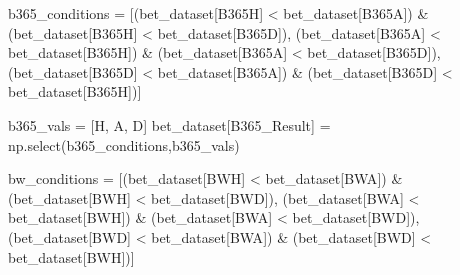 \documentclass[
  letterpaper,
  DIV=11,
  numbers=noendperiod]{scrartcl}
\newenvironment{Shaded}{\begin{snugshade}}{\end{snugshade}}
\newcommand{\NormalTok}[1]{\textcolor[rgb]{0.00,0.23,0.31}{#1}}
\newcommand{\OperatorTok}[1]{\textcolor[rgb]{0.37,0.37,0.37}{#1}}
\newcommand{\StringTok}[1]{\textcolor[rgb]{0.13,0.47,0.30}{#1}}
\begin{document}
\begin{Shaded}
\begin{Highlighting}[]
\NormalTok{b365\_conditions }\OperatorTok{=}\NormalTok{ [(bet\_dataset[}\StringTok{\textquotesingle{}B365H\textquotesingle{}}\NormalTok{] }\OperatorTok{\textless{}}\NormalTok{ bet\_dataset[}\StringTok{\textquotesingle{}B365A\textquotesingle{}}\NormalTok{]) }\OperatorTok{\&}\NormalTok{ (bet\_dataset[}\StringTok{\textquotesingle{}B365H\textquotesingle{}}\NormalTok{] }\OperatorTok{\textless{}}\NormalTok{ bet\_dataset[}\StringTok{\textquotesingle{}B365D\textquotesingle{}}\NormalTok{]),}
\NormalTok{                   (bet\_dataset[}\StringTok{\textquotesingle{}B365A\textquotesingle{}}\NormalTok{] }\OperatorTok{\textless{}}\NormalTok{ bet\_dataset[}\StringTok{\textquotesingle{}B365H\textquotesingle{}}\NormalTok{]) }\OperatorTok{\&}\NormalTok{ (bet\_dataset[}\StringTok{\textquotesingle{}B365A\textquotesingle{}}\NormalTok{] }\OperatorTok{\textless{}}\NormalTok{ bet\_dataset[}\StringTok{\textquotesingle{}B365D\textquotesingle{}}\NormalTok{]),}
\NormalTok{                   (bet\_dataset[}\StringTok{\textquotesingle{}B365D\textquotesingle{}}\NormalTok{] }\OperatorTok{\textless{}}\NormalTok{ bet\_dataset[}\StringTok{\textquotesingle{}B365A\textquotesingle{}}\NormalTok{]) }\OperatorTok{\&}\NormalTok{ (bet\_dataset[}\StringTok{\textquotesingle{}B365D\textquotesingle{}}\NormalTok{] }\OperatorTok{\textless{}}\NormalTok{ bet\_dataset[}\StringTok{\textquotesingle{}B365H\textquotesingle{}}\NormalTok{])]}

\NormalTok{b365\_vals }\OperatorTok{=}\NormalTok{ [}\StringTok{\textquotesingle{}H\textquotesingle{}}\NormalTok{, }\StringTok{\textquotesingle{}A\textquotesingle{}}\NormalTok{, }\StringTok{\textquotesingle{}D\textquotesingle{}}\NormalTok{]}
\NormalTok{bet\_dataset[}\StringTok{\textquotesingle{}B365\_Result\textquotesingle{}}\NormalTok{] }\OperatorTok{=}\NormalTok{ np.select(b365\_conditions,b365\_vals)}

\NormalTok{bw\_conditions }\OperatorTok{=}\NormalTok{ [(bet\_dataset[}\StringTok{\textquotesingle{}BWH\textquotesingle{}}\NormalTok{] }\OperatorTok{\textless{}}\NormalTok{ bet\_dataset[}\StringTok{\textquotesingle{}BWA\textquotesingle{}}\NormalTok{]) }\OperatorTok{\&}\NormalTok{ (bet\_dataset[}\StringTok{\textquotesingle{}BWH\textquotesingle{}}\NormalTok{] }\OperatorTok{\textless{}}\NormalTok{ bet\_dataset[}\StringTok{\textquotesingle{}BWD\textquotesingle{}}\NormalTok{]),}
\NormalTok{                   (bet\_dataset[}\StringTok{\textquotesingle{}BWA\textquotesingle{}}\NormalTok{] }\OperatorTok{\textless{}}\NormalTok{ bet\_dataset[}\StringTok{\textquotesingle{}BWH\textquotesingle{}}\NormalTok{]) }\OperatorTok{\&}\NormalTok{ (bet\_dataset[}\StringTok{\textquotesingle{}BWA\textquotesingle{}}\NormalTok{] }\OperatorTok{\textless{}}\NormalTok{ bet\_dataset[}\StringTok{\textquotesingle{}BWD\textquotesingle{}}\NormalTok{]),}
\NormalTok{                   (bet\_dataset[}\StringTok{\textquotesingle{}BWD\textquotesingle{}}\NormalTok{] }\OperatorTok{\textless{}}\NormalTok{ bet\_dataset[}\StringTok{\textquotesingle{}BWA\textquotesingle{}}\NormalTok{]) }\OperatorTok{\&}\NormalTok{ (bet\_dataset[}\StringTok{\textquotesingle{}BWD\textquotesingle{}}\NormalTok{] }\OperatorTok{\textless{}}\NormalTok{ bet\_dataset[}\StringTok{\textquotesingle{}BWH\textquotesingle{}}\NormalTok{])]}


\end{Highlighting}
\end{Shaded}
\end{document}
